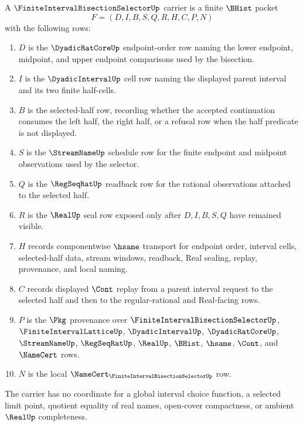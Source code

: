 \begin{definition}
\label{def:finite-interval-bisection-selector}
A $\FiniteIntervalBisectionSelectorUp$ carrier is a finite $\BHist$ packet
$$
F=(D,I,B,S,Q,R,H,C,P,N)
$$
with the following rows:
\begin{enumerate}
\item $D$ is the $\DyadicRatCoreUp$ endpoint-order row naming the lower endpoint, midpoint, and upper endpoint comparisons used by the bisection.
\item $I$ is the $\DyadicIntervalUp$ cell row naming the displayed parent interval and its two finite half-cells.
\item $B$ is the selected-half row, recording whether the accepted continuation consumes the left half, the right half, or a refusal row when the half predicate is not displayed.
\item $S$ is the $\StreamNameUp$ schedule row for the finite endpoint and midpoint observations used by the selector.
\item $Q$ is the $\RegSeqRatUp$ readback row for the rational observations attached to the selected half.
\item $R$ is the $\RealUp$ seal row exposed only after $D,I,B,S,Q$ have remained visible.
\item $H$ records componentwise $\hsame$ transport for endpoint order, interval cells, selected-half data, stream windows, readback, Real sealing, replay, provenance, and local naming.
\item $C$ records displayed $\Cont$ replay from a parent interval request to the selected half and then to the regular-rational and Real-facing rows.
\item $P$ is the $\Pkg$ provenance over $\FiniteIntervalBisectionSelectorUp$, $\FiniteIntervalLatticeUp$, $\DyadicIntervalUp$, $\DyadicRatCoreUp$, $\StreamNameUp$, $\RegSeqRatUp$, $\RealUp$, $\BHist$, $\hsame$, $\Cont$, and $\NameCert$ rows.
\item $N$ is the local $\NameCert_{\FiniteIntervalBisectionSelectorUp}$ row.
\end{enumerate}
The carrier has no coordinate for a global interval choice function, a selected limit point, quotient equality of real names, open-cover compactness, or ambient $\RealUp$ completeness.
\end{definition}

